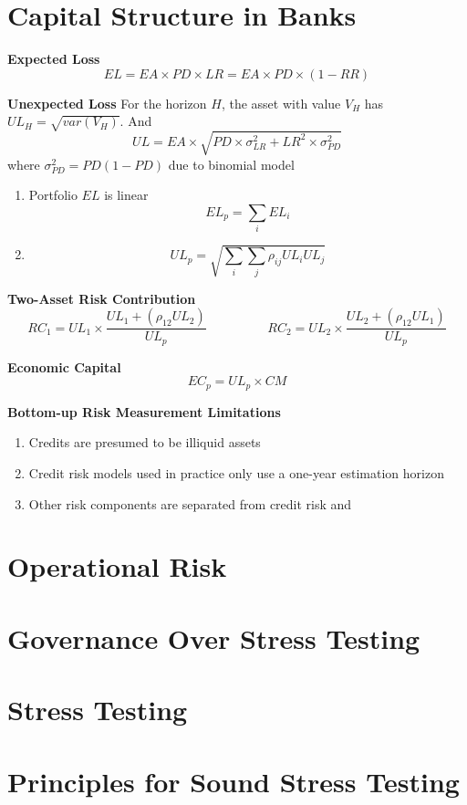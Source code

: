\documentclass[11pt,fleqn]{book} %
\numberwithin{equation}{section} %
\numberwithin{figure}{section} %
\numberwithin{table}{section} %
\begin{document}
\chapter{Capital Structure in Banks}
\begin{definition}\textbf{Expected Loss}
$$
EL=EA\times PD\times LR=EA\times PD\times (1-RR)
$$
\end{definition}
\begin{definition}\textbf{Unexpected Loss}
For the horizon $H$, the asset with value $V_H$ has $UL_{H}=\sqrt{var(V_H)}$. And
$$
UL=EA\times\sqrt{PD\times\sigma_{LR}^2+LR^2\times\sigma_{PD}^2}
$$
where $\sigma_{PD}^2=PD(1-PD)$ due to binomial model
\end{definition}
\begin{definition}
\begin{enumerate}
    \item Portfolio $EL$ is linear
    $$
    EL_p=\sum_{i}EL_i
    $$
    \item 
    $$
    UL_p=\sqrt{\sum_{i}\sum_{j}\rho_{ij}UL_{i}UL_{j}}
    $$
\end{enumerate}
\end{definition}
\begin{definition}\textbf{Two-Asset Risk Contribution}
$$
RC_1=UL_1\times\frac{UL_1+(\rho_{12}UL_2)}{UL_p}\hspace{2cm}RC_2=UL_2\times\frac{UL_2+(\rho_{12}UL_1)}{UL_p}
$$
\end{definition}
\begin{definition}\textbf{Economic Capital}
$$
EC_p=UL_p\times CM
$$
\end{definition}
\begin{remark}\textbf{Bottom-up Risk Measurement Limitations}
\begin{enumerate}
    \item Credits are presumed to be illiquid assets
    \item Credit risk models used in practice only use a one-year estimation horizon
    \item Other risk components are separated from credit risk and
\end{enumerate}
\end{remark}
\chapter{Operational Risk}

\chapter{Governance Over Stress Testing}

\chapter{Stress Testing}

\chapter{Principles for Sound Stress Testing}

 
 
 
 
 
 
 
 
 
\end{document}

